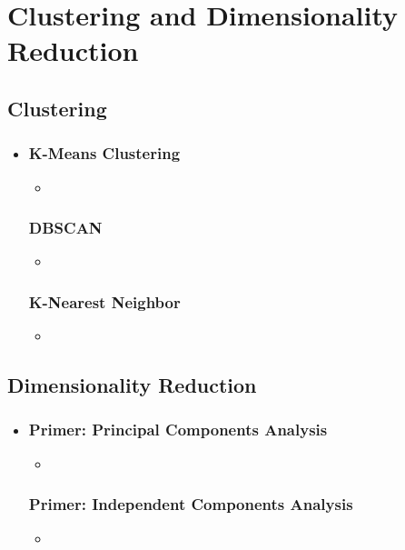 \chapter{Clustering and Dimensionality Reduction}

\section{Clustering}
\begin{itemize}
  \item []
  
  \subsection{K-Means Clustering}
  \begin{itemize}
    \item 
  \end{itemize}

  \subsection{DBSCAN}
  \begin{itemize}
    \item 
  \end{itemize}

  \subsection{K-Nearest Neighbor}
  \begin{itemize}
    \item 
  \end{itemize}
  
\end{itemize}

\section{Dimensionality Reduction}
\begin{itemize}
  \item []
  
  \subsection{Primer: Principal Components Analysis}
  \begin{itemize}
    \item []
  \end{itemize}
    
  \subsection{Primer: Independent Components Analysis}
  \begin{itemize}
    \item 
  \end{itemize}
    
\end{itemize}

